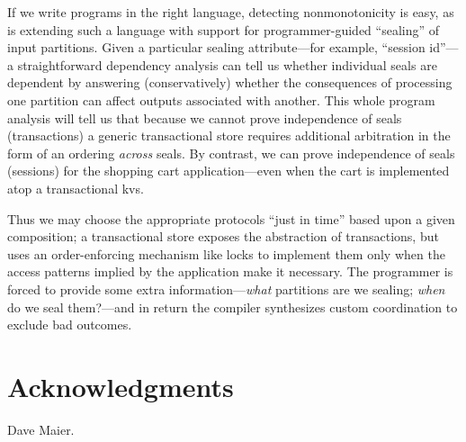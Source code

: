 \documentclass{sig-alternate}
\begin{document}
If we write programs in the right language, detecting nonmonotonicity is easy, as is extending such a language with support for programmer-guided ``sealing'' of input partitions.  Given a particular sealing attribute---for example, ``session id''---a straightforward dependency analysis can tell us whether individual seals are dependent by answering (conservatively) whether the consequences of processing one partition can affect outputs associated with another.  This whole program analysis will tell us that because we cannot prove independence of seals (transactions) a generic transactional store requires additional arbitration in the form of an ordering \emph{across} seals.  By contrast, we can prove independence of seals (sessions) for the shopping cart application---even when the cart is implemented atop a transactional kvs.  

Thus we may choose the appropriate protocols ``just in time'' based upon a given composition; a transactional store exposes the abstraction of transactions, but uses an order-enforcing mechanism like locks to implement them only when the access patterns implied by the application make it necessary. The programmer is forced to provide some extra information---\emph{what} partitions are we sealing; \emph{when} do we seal them?---and in return the compiler synthesizes custom coordination to exclude bad outcomes.  




\section{Acknowledgments}
Dave Maier.



\end{document}
